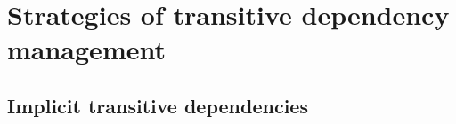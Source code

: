 
\section{Strategies of transitive dependency management} %
\label{sec:strategies_of_transitive_dependency_management}

\subsection{Implicit transitive dependencies} %
\label{sub:implicit_transitive_dependencies}




